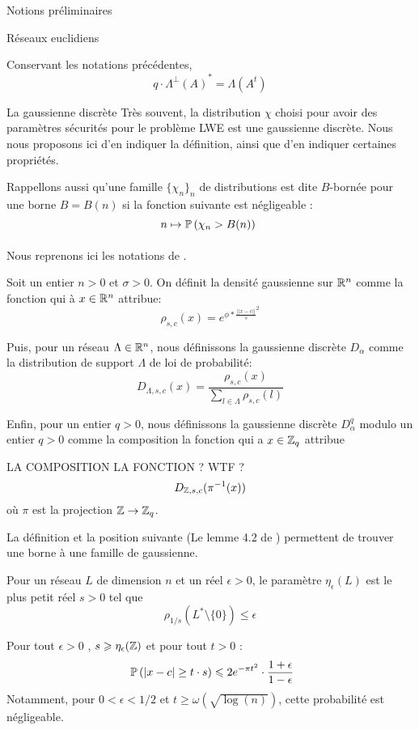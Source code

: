 \begin{section}{Notions préliminaires}
\begin{subsection}{Réseaux euclidiens}
		\begin{prop} \label{lambda_reseau}
	Conservant les notations précédentes, 
	\[q \cdot {\Lambda^\bot(A)}^* =  \Lambda(A^t)\] 
	\end{prop}
	\end{subsection}
	
	\begin{subsection}{La gaussienne discrète}
	Très souvent, la distribution $\chi$ choisi pour avoir des paramètres sécurités pour le problème LWE est une gaussienne discrète. Nous nous proposons ici d'en indiquer la définition, ainsi que d'en indiquer certaines propriétés.

	Rappellons aussi qu'une famille $\{\chi_n\}_n$ de distributions est dite $B$-bornée pour une borne $B = B(n)$ si la fonction suivante est négligeable :
		\[n \mapsto \PP\left(\chi_n > B(n)\right) \]

	\paragraph{}
	Nous reprenons ici les notations de \cite{STOC:GenPeiVai08}.

	Soit un entier $n > 0$  et $\sigma > 0$. On définit la densité gaussienne sur $\mathbb{R}^n$ comme la fonction qui à $x\in\mathbb{R}^n$ attribue:
	\[\rho_{s,c}(x) = e^{\phi * {\frac{||x-c||}{s}}^2} \]

	Puis, pour un réseau $\Lambda \in \mathbb{R}^n$, nous définissons la gaussienne discrète $D_\alpha$ comme la distribution de support $\Lambda$ de loi de probabilité: 	
	\[ D_{\Lambda, s, c}(x) = \frac{\rho_{s,c}(x)}{\sum_{l\in \Lambda}\rho_{s,c}(l)}\]

	Enfin, pour un entier $q > 0$, nous définissons la gaussienne discrète $D^q_{\alpha}$ modulo un entier $q > 0$ comme la composition la fonction qui a $x \in \mathbb{Z}_q$ attribue 
	
	LA COMPOSITION LA FONCTION ? WTF ?  
		\[ D_{\mathbb{Z}, s, c}(\pi^{-1}(x)) \]
	où $\pi$ est la projection $\mathbb{Z} \rightarrow \mathbb{Z}_q$.

La définition et la position suivante (Le lemme 4.2 de \cite{STOC:GenPeiVai08}) permettent de trouver une borne à une famille de gaussienne.
\begin{definition}
Pour un réseau $L$ de dimension $n$ et un réel $\epsilon > 0$, le paramètre $\eta_\epsilon(L)$ est le plus petit réel $s>0$ tel que 
	\[\rho_{1/s}(L^* \setminus \{0\}) \leqslant \epsilon\]
\end{definition}
	\begin{prop}
	Pour tout $\epsilon > 0$ , $s \geqslant \eta_{\epsilon}(\mathbb{Z})$ et pour tout $t>0$ :
	\[ \PP\left(|x-c| \geq t\cdot s\right) \leqslant 2 e^{-\pi t^2}	\cdot \frac{1+\epsilon}{1-\epsilon} \]
	Notamment, pour $0 < \epsilon  < 1/2$ et $t \geqslant \omega(\sqrt{\log(n)})$, cette probabilité est négligeable.
	\end{prop}
	\end{subsection} %
\end{section}
